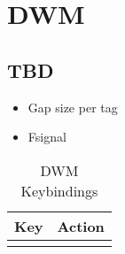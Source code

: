\section{DWM}

\subsection{TBD}

\begin{itemize}
    \item Gap size per tag
    \item Fsignal
\end{itemize}

\begin{longtable}{|c|c|}
    \caption{DWM Keybindings} \\

    \hline
    Key & Action \\
    \hline
    \hline

    \endhead
    \label{tab:dwm-keybindings}



\end{longtable}
